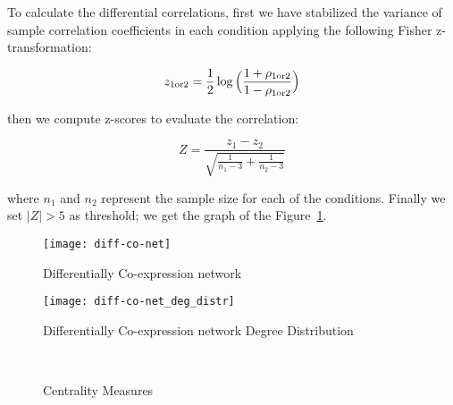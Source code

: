 \documentclass[
10pt, %
a4paper, %
oneside, %
headinclude,footinclude, %
BCOR5mm, %
]{scrartcl}
\begin{document}
To calculate the differential correlations, first we have stabilized the variance  of sample correlation coefficients in each condition applying the following Fisher z-transformation:

$$
z_{1 \text{or} 2} = \frac{1}{2}\log{\Bigl(\frac{1+\rho_{1 \text{or} 2}}{1-\rho_{1 \text{or} 2}}\Bigr)}
$$

then we compute z-scores to evaluate the correlation:

$$
Z = \frac{z_1 - z_2}{\sqrt{\frac{1}{n_1 - 3}+\frac{1}{n_2 - 3}}}
$$

where $n_1$ and $n_2$ represent the sample size for each of the conditions. Finally we set $|Z|> 5$ as threshold; we get the graph of the Figure~\ref{fig:5}.
\begin{figure}[!h]
\centering 
\texttt{[image: diff-co-net]} 
\caption[Differentially Co-expression network]{Differentially Co-expression network} %
\label{fig:5} 
\end{figure}

\begin{figure}[!h]
\centering 
\texttt{[image: diff-co-net\_deg\_distr]} 
\caption[Differentially Co-expression network Degree Distribution]{Differentially Co-expression network Degree Distribution} %
\label{fig:6} 
\end{figure}

\begin{figure}[!h]
\centering
{} \quad
{} \\
 \quad
{}
\caption[Centrality Measures Differential Co-Net]{Centrality Measures} %
\label{fig:esempio}
\end{figure}

\newpage
\end{document}
